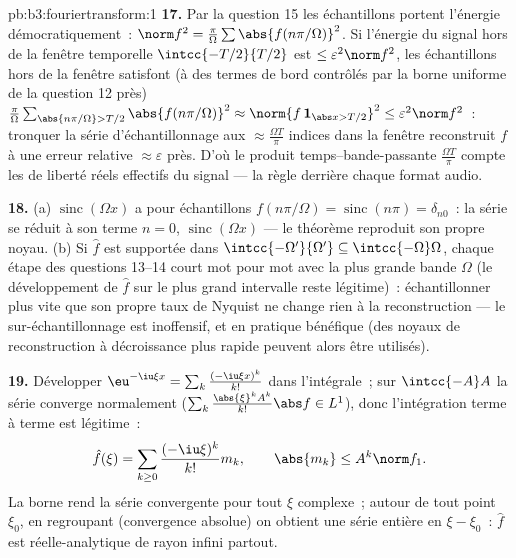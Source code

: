 \begin{solution}{pb:b3:fouriertransform:1}
\textbf{17.} Par la question 15 les échantillons portent
l'énergie démocratiquement~: $\norm f^2 =
\frac\pi\Omega\sum \abs{f(n\pi/\Omega)}^2$. Si l'énergie du
signal hors de la fenêtre temporelle $\intcc{-T/2}{T/2}$ est
$\leq \varepsilon^2\norm f^2$, les échantillons hors de la
fenêtre satisfont (à des termes de bord contrôlés par la
borne uniforme de la question 12 près)
$\frac\pi\Omega\sum_{\abs{n\pi/\Omega} > T/2}
\abs{f(n\pi/\Omega)}^2 \approx \norm{f\,\mathbf 1_{\abs x >
T/2}}^2 \leq \varepsilon^2\norm f^2$~: tronquer la série
d'échantillonnage aux $\approx \frac{\Omega T}\pi$ indices
dans la fenêtre reconstruit $f$ à une erreur relative
$\approx\varepsilon$ près. D'où le produit
temps--bande-passante $\frac{\Omega T}{\pi}$ compte les
 de liberté réels effectifs du signal --- la règle
derrière chaque format audio.

\textbf{18.} (a) $\operatorname{sinc}(\Omega x)$ a pour
échantillons $f(n\pi/\Omega) = \operatorname{sinc}(n\pi) =
\delta_{n0}$~: la série se réduit à son terme $n = 0$,
$\operatorname{sinc}(\Omega x)$ --- le théorème reproduit
son propre noyau. (b) Si $\hat f$ est supportée dans
$\intcc{-\Omega'}{\Omega'} \subseteq
\intcc{-\Omega}\Omega$, chaque étape des questions 13--14
court mot pour mot avec la plus grande bande $\Omega$ (le
développement de $\hat f$ sur le plus grand intervalle reste
légitime)~: échantillonner plus vite que son propre taux de
Nyquist ne change rien à la reconstruction --- le
sur-échantillonnage est inoffensif, et en pratique
bénéfique (des noyaux de reconstruction à décroissance plus
rapide peuvent alors être utilisés).

\textbf{19.} Développer $\eu^{-\iu\xi x} =
\sum_k\frac{(-\iu\xi x)^k}{k!}$ dans l'intégrale~; sur
$\intcc{-A}A$ la série converge normalement
($\sum_k\frac{\abs{\xi}^kA^k}{k!}\abs f \in L^1$), donc
l'intégration terme à terme est légitime~:
\[
\hat f(\xi) = \sum_{k\geq0}\frac{(-\iu\xi)^k}{k!}m_k,
\qquad \abs{m_k} \leq A^k\norm f_1 .
\]
La borne rend la série convergente pour tout $\xi$ complexe~;
autour de tout point $\xi_0$, en regroupant (convergence
absolue) on obtient une série entière en $\xi - \xi_0$~:
$\hat f$ est réelle-analytique de rayon infini partout.


\end{solution}

